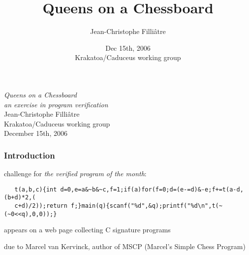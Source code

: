 \documentclass[compress]{beamer}
\title{Queens on a Chessboard}
\author{Jean-Christophe Filli\^atre}
\date[Krakatoa/Caduceus WG]{Dec 15th, 2006\\
  Krakatoa/Caduceus working group}
\begin{document}
\begin{frame}
  \begin{center}
    {\Huge\emph{Queens on a Chessboard}} \\[1em]
    {\LARGE\emph{an exercise in program verification}} \\[3em]
    {\large Jean-Christophe Filli\^atre} \\[2em]
    Krakatoa/Caduceus working group \\[0.5em]
    December 15th, 2006
  \end{center}
\end{frame}
 
\begin{frame}[fragile]
  \frametitle{Introduction}

challenge for \emph{the verified program of the month}:

{\scriptsize
\begin{verbatim}
   t(a,b,c){int d=0,e=a&~b&~c,f=1;if(a)for(f=0;d=(e-=d)&-e;f+=t(a-d,(b+d)*2,(
   c+d)/2));return f;}main(q){scanf("%d",&q);printf("%d\n",t(~(~0<<q),0,0));}
\end{verbatim}}

\Pause

appears on a web page collecting C signature programs 

\bigskip

due to Marcel van Kervinck, author of MSCP (Marcel's Simple
Chess Program)

\end{frame}
\end{document}
